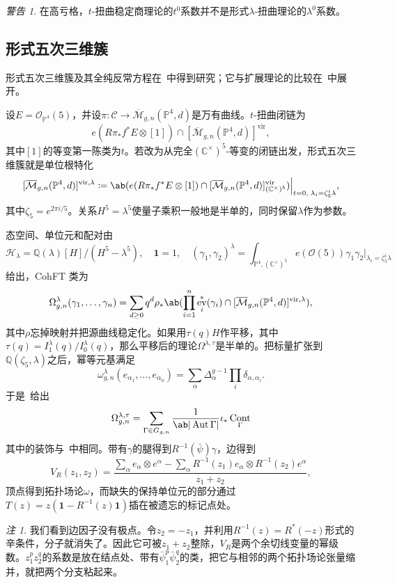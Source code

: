 \documentclass{amsart}
\theoremstyle{definition}
\theoremstyle{remark}
\newtheorem{rmk}[thm]{注}
\newtheorem{warn}[thm]{警告}
\theoremstyle{plain}
\theoremstyle{definition}
\theoremstyle{remark}
\newcommand{\C}{\mathbb{C}}
\newcommand{\Q}{\mathbb{Q}}
\renewcommand{\P}{\mathbb{P}}
\newcommand{\Mbar}{\overline{\mathcal{M}}}
\newcommand{\mc}[1]{\mathcal{#1}}
\newcommand{\mr}[1]{\mathrm{#1}}
\newcommand{\1}{\mathbf{1}}
\newcommand{\2}{\mathbf{2}}
\newcommand{\3}{\mathbf{3}}
\newcommand{\vir}{\mr{vir}}
\DeclareMathOperator{\Aut}{Aut}
\DeclareMathOperator{\ev}{ev}
\DeclareMathOperator{\Cont}{Cont}
\begin{document}
\begin{warn}
    在高亏格，\(t\)-扭曲稳定商理论的\(t^0\)系数并不是形式\(\lambda\)-扭曲理论的\(\lambda^0\)系数。
\end{warn}

\subsection{形式五次三维簇}%
\label{sub:The formal quintic}

形式五次三维簇及其全纯反常方程在~\cite{LhoPandharipande2019}中得到研究；它与扩展理论的比较在~\cite{GJRstructure}中展开。

设\(E = \mc{O}_{\P^4}(5)\)，并设\(\pi \colon \mc{C} \to \Mbar_{g,n}(\P^4,d)\)是万有曲线。\(t\)-扭曲闭链为
\[ e(R\pi_* f^* E \otimes [1]) \cap [\Mbar_{g,n}(\P^4,d)]^{\vir}, \]
其中\([1]\)的等变第一陈类为\(t\)。若改为从完全\((\C^{\times})^5\)-等变的闭链出发，形式五次三维簇就是单位根特化
\[ [\Mbar_{g,n}(\P^4,d)]^{\vir,\lambda} \coloneqq \ab( e(R\pi_*f^*E \otimes [1]) \cap [\Mbar_{g,n}(\P^4,d)]^{\vir}_{(\C^{\times})^5})\Big|_{t=0, \; \lambda_i = \zeta_5^i \lambda}, \]
其中\(\zeta_5 = e^{2\pi i/5}\)。关系\(H^5 = \lambda^5\)使量子乘积一般地是半单的，同时保留\(\lambda\)作为参数。

态空间、单位元和配对由
\[ \mc{H}_{\lambda} = \Q(\lambda)[H]/(H^5-\lambda^5), \quad \1 = 1, \quad (\gamma_1,\gamma_2)^{\lambda} = \int_{\P^4, (\C^{\times})^5} e(\mc{O}(5))\gamma_1\gamma_2 \Big|_{\lambda_i = \zeta_5^i\lambda} \]
给出，CohFT 类为
\[ \Omega^{\lambda}_{g,n}(\gamma_1, \ldots, \gamma_n) = \sum_{d \geq 0} q^d \rho_* \ab( \prod_{i=1}^n \ev_i^*(\gamma_i) \cap [\Mbar_{g,n}(\P^4,d)]^{\vir,\lambda}), \]
其中\(\rho\)忘掉映射并把源曲线稳定化。如果用\(\tau(q)H\)作平移，其中\(\tau(q) = I^{\lambda}_1(q)/I^{\lambda}_0(q)\)，那么平移后的理论\(\Omega^{\lambda,\tau}\)是半单的。把标量扩张到\(\Q(\zeta_5,\lambda)\)之后，幂等元基满足
\[ \omega^{\lambda}_{g,n}(e_{\alpha_1}, \ldots, e_{\alpha_n}) = \sum_{\alpha}\Delta_{\alpha}^{g-1}\prod_i \delta_{\alpha,\alpha_i}. \]
于是~给出
\[ \Omega^{\lambda,\tau}_{g,n} = \sum_{\Gamma \in G_{g,n}} \frac{1}{\ab|\Aut\Gamma|}\iota_* \Cont_{\Gamma} \]
其中的装饰与~中相同。带有\(\gamma\)的腿得到\(R^{-1}(\bar{\psi})\gamma\)，边得到
\[ V_R(z_1,z_2) = \frac{\sum_{\alpha} e_{\alpha}\otimes e^{\alpha} - \sum_{\alpha} R^{-1}(z_1)e_{\alpha} \otimes R^{-1}(z_2)e^{\alpha}}{z_1+z_2}, \]
顶点得到拓扑场论\(\omega\)，而缺失的保持单位元的部分通过\(T(z) = z(\1 - R^{-1}(z)\1)\)插在被遗忘的标记点处。

\begin{rmk}
    我们看到边因子没有极点。令\(z_2 = -z_1\)，并利用\(R^{-1}(z) = R^*(-z)\)形式的辛条件，分子就消失了。因此它可被\(z_1+z_2\)整除，\(V_R\)是两个余切线变量的幂级数。\(z_1^p z_2^q\)的系数是放在结点处、带有\(\bar{\psi}_1^p \bar{\psi}_2^q\)的类，把它与相邻的两个拓扑场论张量缩并，就把两个分支粘起来。
\end{rmk}
\end{document}
